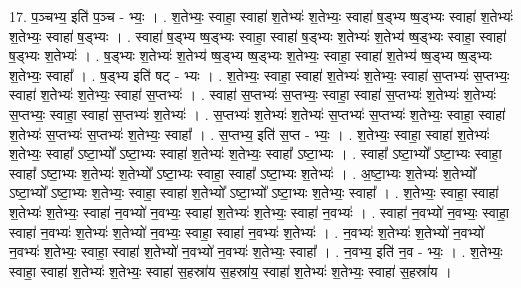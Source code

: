 \documentclass[17pt]{extarticle}
\begin{document}
17. प॒ञ्चभ्य॒ इति॑ प॒ञ्च - भ्यः॒ । . श॒तेभ्यः॒ स्वाहा॒ स्वाहा॑ श॒तेभ्यः॑ श॒तेभ्यः॒ स्वाहा॑ ष॒ड्भ्य ष्ष॒ड्भ्यः स्वाहा॑ श॒तेभ्यः॑ श॒तेभ्यः॒ स्वाहा॑ ष॒ड्भ्यः । . स्वाहा॑ ष॒ड्भ्य ष्ष॒ड्भ्यः स्वाहा॒ स्वाहा॑ ष॒ड्भ्यः श॒तेभ्यः॑ श॒तेभ्य॑ ष्ष॒ड्भ्यः स्वाहा॒ स्वाहा॑ ष॒ड्भ्यः श॒तेभ्यः॑ । . ष॒ड्भ्यः श॒तेभ्यः॑ श॒तेभ्य॑ ष्ष॒ड्भ्य ष्ष॒ड्भ्यः श॒तेभ्यः॒ स्वाहा॒ स्वाहा॑ श॒तेभ्य॑ ष्ष॒ड्भ्य ष्ष॒ड्भ्यः श॒तेभ्यः॒ स्वाहा᳚ । . ष॒ड्भ्य इति॑ षट् - भ्यः । . श॒तेभ्यः॒ स्वाहा॒ स्वाहा॑ श॒तेभ्यः॑ श॒तेभ्यः॒ स्वाहा॑ स॒प्तभ्यः॑ स॒प्तभ्यः॒ स्वाहा॑ श॒तेभ्यः॑ श॒तेभ्यः॒ स्वाहा॑ स॒प्तभ्यः॑ । . स्वाहा॑ स॒प्तभ्यः॑ स॒प्तभ्यः॒ स्वाहा॒ स्वाहा॑ स॒प्तभ्यः॑ श॒तेभ्यः॑ श॒तेभ्यः॑ स॒प्तभ्यः॒ स्वाहा॒ स्वाहा॑ स॒प्तभ्यः॑ श॒तेभ्यः॑ । . स॒प्तभ्यः॑ श॒तेभ्यः॑ श॒तेभ्यः॑ स॒प्तभ्यः॑ स॒प्तभ्यः॑ श॒तेभ्यः॒ स्वाहा॒ स्वाहा॑ श॒तेभ्यः॑ स॒प्तभ्यः॑ स॒प्तभ्यः॑ श॒तेभ्यः॒ स्वाहा᳚ । . स॒प्तभ्य॒ इति॑ स॒प्त - भ्यः॒ । . श॒तेभ्यः॒ स्वाहा॒ स्वाहा॑ श॒तेभ्यः॑ श॒तेभ्यः॒ स्वाहा᳚ ऽष्टा॒भ्यो᳚ ऽष्टा॒भ्यः स्वाहा॑ श॒तेभ्यः॑ श॒तेभ्यः॒ स्वाहा᳚ ऽष्टा॒भ्यः । . स्वाहा᳚ ऽष्टा॒भ्यो᳚ ऽष्टा॒भ्यः स्वाहा॒ स्वाहा᳚ ऽष्टा॒भ्यः श॒तेभ्यः॑ श॒तेभ्यो᳚ ऽष्टा॒भ्यः स्वाहा॒ स्वाहा᳚ ऽष्टा॒भ्यः श॒तेभ्यः॑ । . अ॒ष्टा॒भ्यः श॒तेभ्यः॑ श॒तेभ्यो᳚ ऽष्टा॒भ्यो᳚ ऽष्टा॒भ्यः श॒तेभ्यः॒ स्वाहा॒ स्वाहा॑ श॒तेभ्यो᳚ ऽष्टा॒भ्यो᳚ ऽष्टा॒भ्यः श॒तेभ्यः॒ स्वाहा᳚ । . श॒तेभ्यः॒ स्वाहा॒ स्वाहा॑ श॒तेभ्यः॑ श॒तेभ्यः॒ स्वाहा॑ न॒वभ्यो॑ न॒वभ्यः॒ स्वाहा॑ श॒तेभ्यः॑ श॒तेभ्यः॒ स्वाहा॑ न॒वभ्यः॑ । . स्वाहा॑ न॒वभ्यो॑ न॒वभ्यः॒ स्वाहा॒ स्वाहा॑ न॒वभ्यः॑ श॒तेभ्यः॑ श॒तेभ्यो॑ न॒वभ्यः॒ स्वाहा॒ स्वाहा॑ न॒वभ्यः॑ श॒तेभ्यः॑ । . न॒वभ्यः॑ श॒तेभ्यः॑ श॒तेभ्यो॑ न॒वभ्यो॑ न॒वभ्यः॑ श॒तेभ्यः॒ स्वाहा॒ स्वाहा॑ श॒तेभ्यो॑ न॒वभ्यो॑ न॒वभ्यः॑ श॒तेभ्यः॒ स्वाहा᳚ । . न॒वभ्य॒ इति॑ न॒व - भ्यः॒ । . श॒तेभ्यः॒ स्वाहा॒ स्वाहा॑ श॒तेभ्यः॑ श॒तेभ्यः॒ स्वाहा॑ स॒हस्रा॑य स॒हस्रा॑य॒ स्वाहा॑ श॒तेभ्यः॑ श॒तेभ्यः॒ स्वाहा॑ स॒हस्रा॑य । \newline
\end{document}
